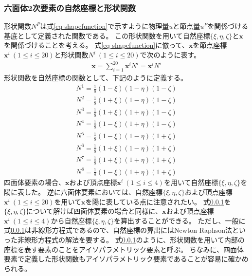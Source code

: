 \documentclass{jarticle}
\begin{document}
\subsubsection{六面体2次要素の自然座標と形状関数}
形状関数$N^P$は式\ref{eq-shapefunction}で示すように物理量$u$と節点量$u^P$を関係づける基底として定義された関数である。
この形状関数を用いて自然座標$\{\xi, \eta, \zeta\}$と$\bm{x}$を関係づけることを考える。
式\ref{eq-shapefunction}に倣って、$\bm{x}$を節点座標$\bm{x}^i~(1\leq i\leq 20)$と形状関数$N^i~(1\leq i\leq 20)$で次のように表す。
\begin{align}
  \bm{x} = \sum_{i=1}^{20}\bm{x}^iN^i = \bm{x}^iN^i
\end{align}
形状関数を自然座標の関数として、下記のように定義する。
\begin{align}
  N^1 = \frac{1}{8}(1-\xi)(1-\eta)(1-\zeta)\\
  N^2 = \frac{1}{8}(1+\xi)(1-\eta)(1-\zeta)\\
  N^3 = \frac{1}{8}(1+\xi)(1+\eta)(1-\zeta)\\
  N^4 = \frac{1}{8}(1-\xi)(1+\eta)(1-\zeta)\\
  N^5 = \frac{1}{8}(1-\xi)(1-\eta)(1+\zeta)\\
  N^6 = \frac{1}{8}(1+\xi)(1-\eta)(1+\zeta)\\
  N^7 = \frac{1}{8}(1+\xi)(1+\eta)(1+\zeta)\\
  N^8 = \frac{1}{8}(1-\xi)(1+\eta)(1+\zeta)
\end{align}
四面体要素の場合、$\bm{x}$および頂点座標$\bm{x}^i~(1\leq i\leq 4)$を用いて自然座標$\{\xi, \eta, \zeta\}$を陽に表した。
逆に六面体要素においては、自然座標$\{\xi, \eta, \zeta\}$および頂点座標$\bm{x}^i~(1\leq i\leq 20)$を用いて$\bm{x}$を陽に表している点に注意されたい。
式\ref{}を$\{\xi, \eta, \zeta\}$について解けば四面体要素の場合と同様に、$\bm{x}$および頂点座標$\bm{x}^i~(1\leq i\leq 4)$から自然座標$\{\xi, \eta, \zeta\}$を算出することができる。
ただし、一般に式\ref{}は非線形方程式であるので、自然座標の算出にはNewton-Raphson法といった非線形方程式の解法を要する。
式\ref{}のように、形状関数を用いて内部の座標を表す要素のことをアイソパラメトリック要素と呼ぶ。
ちなみに、四面体要素で定義した形状関数もアイソパラメトリック要素であることが容易に確かめられる。
\end{document}
